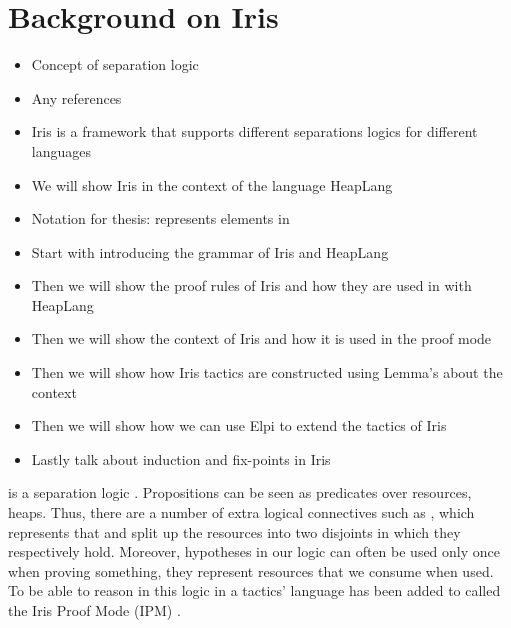 \documentclass[thesis.tex]{subfiles}
\begin{document}
\chapter{Background on Iris}



\begin{itemize}
  \item Concept of separation logic
  \item Any references
  \item Iris is a framework that supports different separations logics for different languages
  \item We will show Iris in the context of the language HeapLang
  \item Notation for thesis:  represents elements in \coq
  \item Start with introducing the grammar of Iris and HeapLang
  \item Then we will show the proof rules of Iris and how they are used in with HeapLang
  \item Then we will show the context of Iris and how it is used in the proof mode
  \item Then we will show how Iris tactics are constructed using Lemma's about the context
  \item Then we will show how we can use Elpi to extend the tactics of Iris
  \item Lastly talk about induction and fix-points in Iris
\end{itemize}

\iris is a separation logic \cite*{jungIrisMonoidsInvariants2015a,jungHigherorderGhostState2016,krebbersEssenceHigherOrderConcurrent2017,jungIrisGroundModular2018}. Propositions can be seen as predicates over resources, \eg heaps. Thus, there are a number of extra logical connectives such as , which represents that  and  split up the resources into two disjoints in which they respectively hold. Moreover, hypotheses in our logic can often be used only once when proving something, they represent resources that we consume when used. To be able to reason in this logic in \coq a tactics' language has been added to \coq called the Iris Proof Mode (IPM) \cite*{krebbersInteractiveProofsHigherorder2017,krebbersMoSeLGeneralExtensible2018}.
\end{document}
